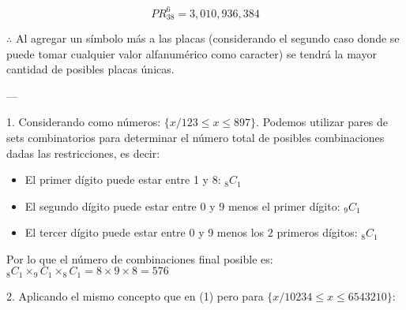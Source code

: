 \documentclass{article}
\begin{document}
$$PR^{6}_{38} = 3,010,936,384$$

$\therefore$ Al agregar un símbolo más a las placas (considerando el segundo caso donde se puede tomar cualquier valor alfanumérico como caracter) se tendrá la mayor cantidad de posibles placas únicas.

---

\bigskip


1. Considerando como números: $\{x / 123 \leq x \leq 897\}$. Podemos utilizar pares de sets combinatorios para determinar el número total de posibles combinaciones dadas las restricciones, es decir:

\begin{itemize}
    \item El primer dígito puede estar entre 1 y 8: $_8C_1$
    \item El segundo dígito puede estar entre 0 y 9 menos el primer dígito: $_9C_1$
    \item El tercer dígito puede estar entre 0 y 9 menos los 2 primeros dígitos: $_8C_1$
\end{itemize}

Por lo que el número de combinaciones final posible es: $_8C_1 \times _9C_1 \times _8C_1 = 8 \times 9 \times 8 = 576$

\bigskip

2. Aplicando el mismo concepto que en (1) pero para $\{x / 10234 \leq x \leq 6543210 \}$:






















\medskip
\end{document}
